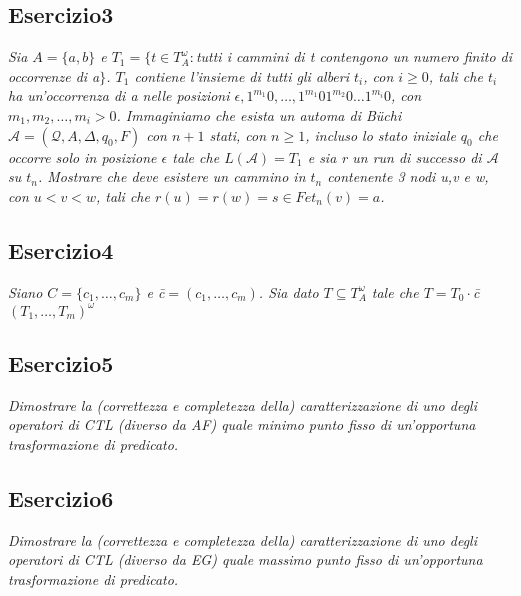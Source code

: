 \documentclass[12pt]{article}
\newcommand{\A}{\ensuremath{\mathcal{A}}\xspace}
\newcommand{\Buchi}{\ensuremath{\mathcal{A} = (\mathcal{Q},A,\Delta,q_0,F)}\xspace}
\newcommand{\buchi}{B\"uchi }
\begin{document}
\subsection*{Esercizio3}
\textit{Sia $A=\{a,b\}$ e $T_1=\{t\in T^{\omega}_A:$tutti i cammini di t contengono un numero finito di occorrenze di a$\}$. $T_1$ contiene l'insieme di tutti gli alberi $t_i$, con $i\geqslant 0$, tali che $t_i$ ha un'occorrenza di a nelle posizioni $\epsilon, 1^{m_1}0,\ldots,1^{m_1}01^{m_2}0\ldots 1^{m_i}0$, con $m_1,m_2,\ldots,m_i>0$. Immaginiamo che esista un automa di \buchi $\Buchi$ con $n+1$ stati, con $n\geqslant 1$, incluso lo stato iniziale $q_0$ che occorre solo in posizione $\epsilon$ tale che $L(\A)=T_1$ e sia r un run di successo di $\A$ su $t_n$. Mostrare che deve esistere un cammino in $t_n$ contenente 3 nodi u,v e w, con $u<v<w$, tali che $r(u)=r(w)=s \in F e t_n(v)=a$.}


\subsection*{Esercizio4}
\textit{Siano $C=\{c_1,\ldots,c_m\}$ e \=c$= ( c_1,\ldots,c_m) $. Sia dato $T \subseteq T^{\omega}_A$ tale che $T=T_0 \cdot$\=c$(T_1,\ldots,T_m)^{\omega}$}


\subsection*{Esercizio5}
\textit{Dimostrare la (correttezza e completezza della) caratterizzazione di uno degli operatori di CTL (diverso da AF) quale minimo punto fisso di un’opportuna trasformazione di predicato.}


\subsection*{Esercizio6}
\textit{Dimostrare la (correttezza e completezza della) caratterizzazione di uno degli operatori di CTL (diverso da EG) quale massimo punto fisso di un’opportuna trasformazione di predicato.}
\end{document}
